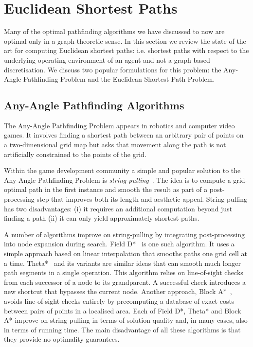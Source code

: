 \section{Euclidean Shortest Paths}
\label{cha::lit::euclidean}
Many of the optimal pathfinding algorithms we have discussed to now are optimal only in 
a graph-theoretic sense. In this section we review the state of the art for computing
Euclidean shortest paths: i.e. shortest paths with respect to the underlying operating 
environment of an agent and not a graph-based discretisation. We discuss two popular
formulations for this problem: the Any-Angle Pathfinding Problem and the Euclidean Shortest
Path Problem. 

\subsection{Any-Angle Pathfinding Algorithms}
\label{cha::lit::euclidean:anyangle}
The Any-Angle Pathfinding Problem appears in robotics and computer video games. It involves finding
a shortest path between an arbitrary pair of points on a two-dimensional grid map but asks that
movement along the path is not artificially constrained to the points of the grid.

Within the game development community a simple and popular solution to the Any-Angle Pathfinding
Problem is \emph{string pulling}~\cite{pinter01,botea04}.  The idea is to compute a grid-optimal
path in the first instance and smooth the result as part of a post-processing step that improves
both its length and aesthetic appeal. String pulling has two disadvantages: (i) it requires an
additional computation beyond just finding a path (ii) it can only yield approximately shortest
paths.

A number of algorithms improve on string-pulling by integrating post-processing into node expansion
during search. Field D*~\citep{ferguson05} is one such algorithm. It uses a simple approach based on
linear interpolation that smooths paths one grid cell at a time.  Theta*~\citep{nash07} and its
variants \citep{nash09,nash10,munoz12} are similar ideas that can smooth much longer path segments in a
single operation. This algorithm relies on line-of-sight checks from each successor of a node to its
grandparent. A successful check introduces a new shortcut that bypasses the current node.  Another
approach, Block A*~\cite{yap11}, avoids line-of-sight checks entirely by precomputing a database of
exact costs between pairs of points in a localised area.  Each of Field D*, Theta* and Block A*
improve on string pulling in terms of solution quality and, in many cases, also in terms of running
time.  The main disadvantage of all these algorithms is that they provide no optimality guarantees.

